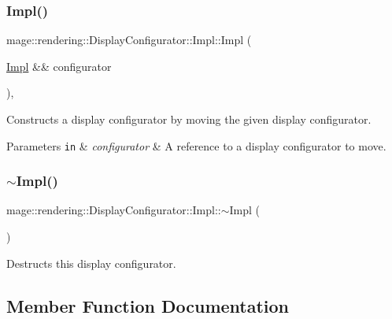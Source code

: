 \subsubsection{\texorpdfstring{Impl()}{Impl()}\hspace{0.1cm}{\footnotesize\ttfamily [4/4]}}
{\footnotesize\ttfamily mage\+::rendering\+::\+Display\+Configurator\+::\+Impl\+::\+Impl (\begin{DoxyParamCaption}\item[{\hyperlink{classmage_1_1rendering_1_1_display_configurator_1_1_impl}{Impl} \&\&}]{configurator }\end{DoxyParamCaption})\hspace{0.3cm}{\ttfamily [default]}, {\ttfamily [noexcept]}}

Constructs a display configurator by moving the given display configurator.


\begin{DoxyParams}[1]{Parameters}
\mbox{\tt in}  & {\em configurator} & A reference to a display configurator to move. \\
\hline
\end{DoxyParams}
\hypertarget{classmage_1_1rendering_1_1_display_configurator_1_1_impl_a499b92d9d77a4c31cbdefa3a3c22a0be}{}\label{classmage_1_1rendering_1_1_display_configurator_1_1_impl_a499b92d9d77a4c31cbdefa3a3c22a0be} 
\subsubsection{\texorpdfstring{$\sim$\+Impl()}{~Impl()}}
{\footnotesize\ttfamily mage\+::rendering\+::\+Display\+Configurator\+::\+Impl\+::$\sim$\+Impl (\begin{DoxyParamCaption}{ }\end{DoxyParamCaption})\hspace{0.3cm}{\ttfamily [default]}}

Destructs this display configurator. 

\subsection{Member Function Documentation}
\hypertarget{classmage_1_1rendering_1_1_display_configurator_1_1_impl_a9f0f3a2dbe7a8e401fe11735076655ca}{}\label{classmage_1_1rendering_1_1_display_configurator_1_1_impl_a9f0f3a2dbe7a8e401fe11735076655ca} 
